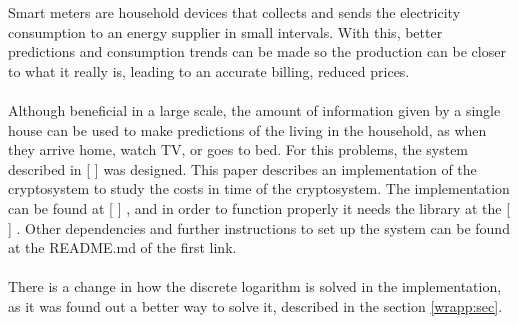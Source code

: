 
   Smart meters are household devices that collects and sends the electricity
   consumption to an energy supplier in small intervals. With this, better
   predictions and consumption trends can be made so the production can be closer to what it really is, leading to an accurate billing, reduced prices.\\
   \\
   Although beneficial in a large scale, the amount of information given by a single house can be used to make predictions of the living in the household, as when they arrive home, watch TV, or goes to bed. For this problems, the system described in [ ] %
   was designed. This paper describes an implementation of the cryptosystem to study the costs in time of the cryptosystem. The implementation can be found at [ ]%
   , and in order to function properly it needs the library at the [ ]
   . Other dependencies and further instructions to set up the system can be found at the README.md of the first link.
   \\\\
   There is a change in how the discrete logarithm is solved in the implementation, as it was found out a better way to solve it, described in
   the section \ref{wrapp:sec}.
   
